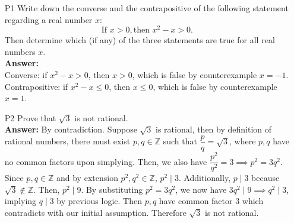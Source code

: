 \documentclass{article}
\begin{document}
\begin{itemize}
    \item [P1] Write down the converse and the contrapositive of the following statement regarding a real number $x$: \[\text{If } x>0, \text{then } x^2-x>0.\] Then determine which (if any) of the three statements are true for all real numbers $x$.\\
          \textbf{Answer: }\\Converse: if $x^2-x>0$, then $x>0$, which is false by counterexample $x=-1$. \\Contrapositive: if $x^2-x\leq0$, then $x\leq0$, which is false by counterexample $x=1$.
    \item [P2] Prove that $\sqrt{3}$ is not rational.\\
          \textbf{Answer: } By contradiction. Suppose $\sqrt{3}$ is rational, then by definition of rational numbers, there must exist $p,q\in\mathbb{Z}$ such that $\dfrac{p}{q}=\sqrt{3}$, where $p,q$ have no common factors upon simplying. Then, we also have $\dfrac{p^2}{q^2}=3\implies p^2=3q^2$. Since $p,q\in\mathbb{Z}$ and by extension $p^2,q^2\in\mathbb{Z}$, $p^2\mid 3$. Additionally, $p\mid 3$ because $\sqrt{3}\notin\mathbb{Z}$. Then, $p^2\mid 9$. By substituting $p^2=3q^2$, we now have $3q^2\mid 9\implies q^2\mid 3$, implying $q\mid 3$ by previous logic. Then $p,q$ have common factor $3$ which contradicts with our initial assumption. Therefore $\sqrt{3}$ is not rational.
\end{itemize}
\end{document}
